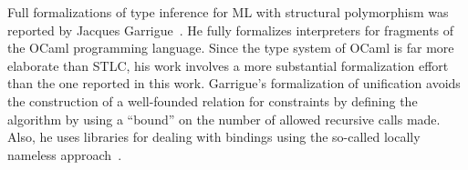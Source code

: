 Full formalizations of type inference for ML with structural
polymorphism was reported by Jacques
Garrigue~\cite{Garrigue10,Garrigue15}. He fully formalizes
interpreters for fragments of the OCaml programming language. Since
the type system of OCaml is far more elaborate than STLC, his work
involves a more substantial formalization effort than the one reported
in this work. Garrigue's formalization of unification avoids the
construction of a well-founded relation for constraints by defining
the algorithm by using a ``bound'' on the number of allowed recursive
calls made.  Also, he uses libraries for dealing with bindings using
the so-called locally nameless approach~\cite{Chargueraud12}.

